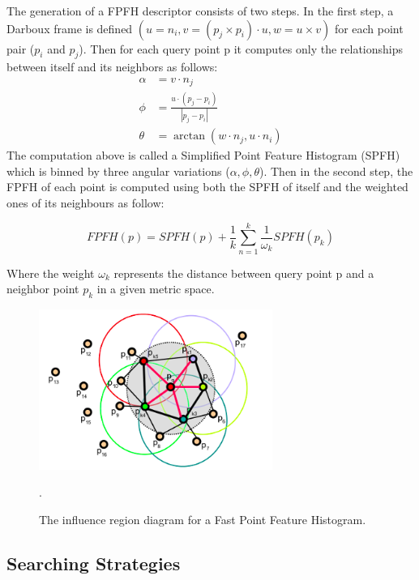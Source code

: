 The generation of a FPFH descriptor consists of two steps. In the first step, a Darboux frame is defined $(u=n_{i},v=(p_{j} \times p_{i}) \cdot u,w=u\times v)$ for each point pair ($p_{i}$ and $p_{j}$). Then for each query point p it computes only the relationships between itself and its neighbors as follows:
\begin{align}
    \alpha& = v \cdot n_{j}\nonumber \\
    \phi&= \frac{u \cdot (p_{j} - p_{i})}{|p_{j} - p_{i}|}\label{pfheq} \\
    \theta &= \arctan(w \cdot n_{j} , u \cdot n_{i})\nonumber
\end{align}
The computation above is called a Simplified Point Feature Histogram (SPFH) which is binned by three angular variations ($\alpha , \phi , \theta$). Then in the second step, the FPFH of each point is computed using both the SPFH of itself and the weighted ones of its neighbours as follow:

\begin{equation}\label{fpfheq}
    FPFH(p) = SPFH(p)+\frac{1}{k}\sum\limits_{n=1}^{k}\frac{1}{\omega _{k}}SPFH(p_{k})
\end{equation}

Where the weight $\omega _{k}$ represents the distance between query point p and a neighbor point $p_{k}$ in a given metric space.

\begin{figure}[!h]
\begin{center}
\includegraphics[width=3in]{figures03/fpfh1.png}
\caption{The influence region diagram for a Fast Point Feature Histogram. \cite{algFpfh}}.
\label{fig:fpfh}
\end{center}
\end{figure}

\subsection{Searching Strategies}

